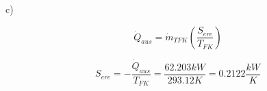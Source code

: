 c)

\[
\dot{Q}_{aus} = \dot{m}_{TFK} \left( \frac{S_{ere}}{T_{FK}} \right)
\]

\[
S_{ere} = - \frac{\dot{Q}_{aus}}{T_{FK}} = \frac{62.203 kW}{293.12 K} = 0.2122 \frac{kW}{K}
\]